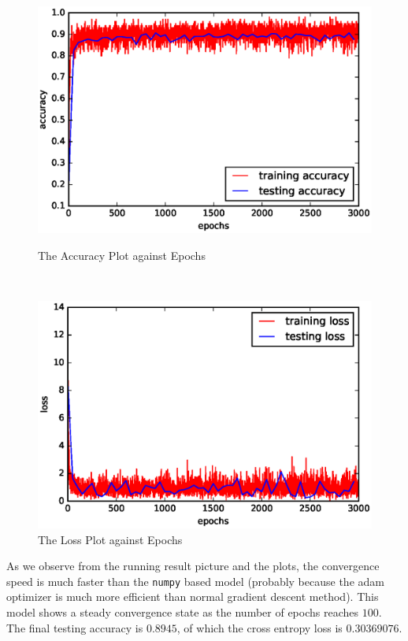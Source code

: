 \documentclass[10pt]{article}
\begin{document}
\begin{figure}[H]
\centering
\begin{minipage}[b]{0.45\textwidth}
\centering
\includegraphics[scale=.45]{plot3.eps}
\caption{The Accuracy Plot against Epochs}
\label{plot3}
\end{minipage}
\
\begin{minipage}[b]{0.45\textwidth}
\centering
\includegraphics[scale=.45]{plot4.eps}
\caption{The Loss Plot against Epochs}
\label{plot4}
\end{minipage}
\end{figure}
As we observe from the running result picture and the plots, the convergence speed is much faster than the \texttt{numpy} based model (probably because the adam optimizer is much more efficient than normal gradient descent method). This model shows a steady convergence state as the number of epochs reaches $100$. The final testing accuracy is $0.8945$, of which the cross entropy loss is $0.30369076$.\par
\end{document}
